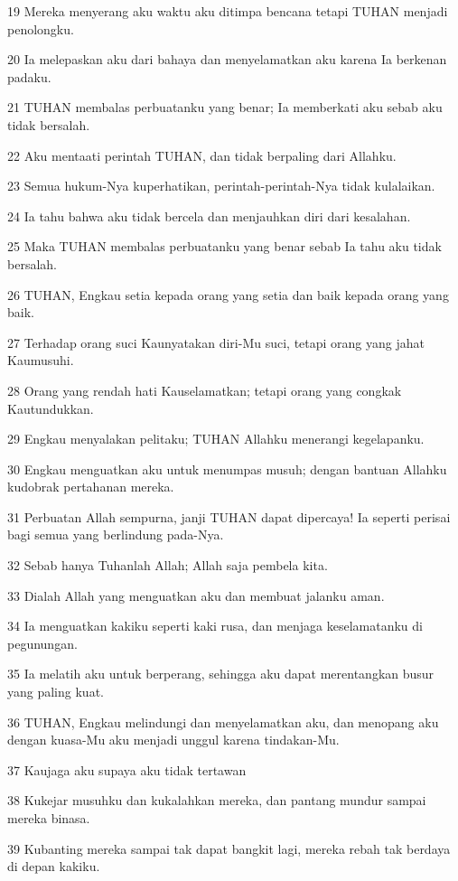 \par 19 Mereka menyerang aku waktu aku ditimpa bencana tetapi TUHAN menjadi penolongku.
\par 20 Ia melepaskan aku dari bahaya dan menyelamatkan aku karena Ia berkenan padaku.
\par 21 TUHAN membalas perbuatanku yang benar; Ia memberkati aku sebab aku tidak bersalah.
\par 22 Aku mentaati perintah TUHAN, dan tidak berpaling dari Allahku.
\par 23 Semua hukum-Nya kuperhatikan, perintah-perintah-Nya tidak kulalaikan.
\par 24 Ia tahu bahwa aku tidak bercela dan menjauhkan diri dari kesalahan.
\par 25 Maka TUHAN membalas perbuatanku yang benar sebab Ia tahu aku tidak bersalah.
\par 26 TUHAN, Engkau setia kepada orang yang setia dan baik kepada orang yang baik.
\par 27 Terhadap orang suci Kaunyatakan diri-Mu suci, tetapi orang yang jahat Kaumusuhi.
\par 28 Orang yang rendah hati Kauselamatkan; tetapi orang yang congkak Kautundukkan.
\par 29 Engkau menyalakan pelitaku; TUHAN Allahku menerangi kegelapanku.
\par 30 Engkau menguatkan aku untuk menumpas musuh; dengan bantuan Allahku kudobrak pertahanan mereka.
\par 31 Perbuatan Allah sempurna, janji TUHAN dapat dipercaya! Ia seperti perisai bagi semua yang berlindung pada-Nya.
\par 32 Sebab hanya Tuhanlah Allah; Allah saja pembela kita.
\par 33 Dialah Allah yang menguatkan aku dan membuat jalanku aman.
\par 34 Ia menguatkan kakiku seperti kaki rusa, dan menjaga keselamatanku di pegunungan.
\par 35 Ia melatih aku untuk berperang, sehingga aku dapat merentangkan busur yang paling kuat.
\par 36 TUHAN, Engkau melindungi dan menyelamatkan aku, dan menopang aku dengan kuasa-Mu aku menjadi unggul karena tindakan-Mu.
\par 37 Kaujaga aku supaya aku tidak tertawan
\par 38 Kukejar musuhku dan kukalahkan mereka, dan pantang mundur sampai mereka binasa.
\par 39 Kubanting mereka sampai tak dapat bangkit lagi, mereka rebah tak berdaya di depan kakiku.
